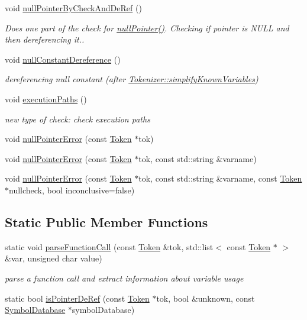 \begin{DoxyCompactItemize}
void \hyperlink{class_check_null_pointer_a427f94502edd08dd75f3320d6dfb2fc6}{null\-Pointer\-By\-Check\-And\-De\-Ref} ()
\begin{DoxyCompactList}\small\item\em Does one part of the check for \hyperlink{class_check_null_pointer_a3dd4409792f2a5ed98aa518cf8e665be}{null\-Pointer()}. Checking if pointer is N\-U\-L\-L and then dereferencing it.. \end{DoxyCompactList}\item 
void \hyperlink{class_check_null_pointer_aaeaa123feaedb7f40133c8d8616052a6}{null\-Constant\-Dereference} ()
\begin{DoxyCompactList}\small\item\em dereferencing null constant (after \hyperlink{class_tokenizer_ae1824db120475c5d75b742e7eac9276a}{Tokenizer\-::simplify\-Known\-Variables}) \end{DoxyCompactList}\item 
void \hyperlink{class_check_null_pointer_a0c3fb89b7705a29b2835aedfcea8b5e6}{execution\-Paths} ()
\begin{DoxyCompactList}\small\item\em new type of check\-: check execution paths \end{DoxyCompactList}\item 
void \hyperlink{class_check_null_pointer_abb0c366115f44fc3aa07521f02d33859}{null\-Pointer\-Error} (const \hyperlink{class_token}{Token} $\ast$tok)
\item 
void \hyperlink{class_check_null_pointer_a9ec71b5d680b12385d4f191eb4b2656d}{null\-Pointer\-Error} (const \hyperlink{class_token}{Token} $\ast$tok, const std\-::string \&varname)
\item 
void \hyperlink{class_check_null_pointer_a0e76e6f3d3b9bb77d0d66431140ef5c8}{null\-Pointer\-Error} (const \hyperlink{class_token}{Token} $\ast$tok, const std\-::string \&varname, const \hyperlink{class_token}{Token} $\ast$nullcheck, bool inconclusive=false)
\end{DoxyCompactItemize}
\subsection*{Static Public Member Functions}
\begin{DoxyCompactItemize}
\item 
static void \hyperlink{class_check_null_pointer_afe8e4976430e50d51236184d62241afa}{parse\-Function\-Call} (const \hyperlink{class_token}{Token} \&tok, std\-::list$<$ const \hyperlink{class_token}{Token} $\ast$ $>$ \&var, unsigned char value)
\begin{DoxyCompactList}\small\item\em parse a function call and extract information about variable usage \end{DoxyCompactList}\item 
static bool \hyperlink{class_check_null_pointer_a7f4cc2efbed79c78906185b6d06b0e24}{is\-Pointer\-De\-Ref} (const \hyperlink{class_token}{Token} $\ast$tok, bool \&unknown, const \hyperlink{class_symbol_database}{Symbol\-Database} $\ast$symbol\-Database)
\end{DoxyCompactItemize}
